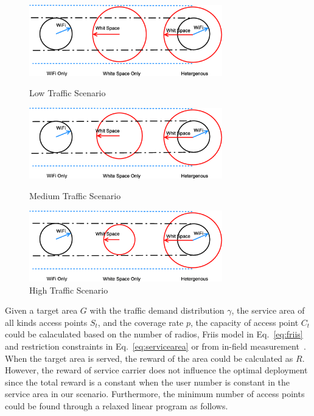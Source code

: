 \begin{figure}
\centering
\includegraphics[width=84mm]{figures/lowtraffic}
\vspace{-0.1in}
\caption{Low Traffic Scenario}                                                                 
\label{fig:lowtraffic}

\includegraphics[width=84mm]{figures/mediumtraffic}
\vspace{-0.1in}
\caption{Medium Traffic Scenario}                                                                 
\label{fig:mediumtraffic}


\includegraphics[width=84mm]{figures/hightraffic}
\vspace{-0.1in}
\caption{High Traffic Scenario}                                                                 
\label{fig:hightraffic}
\vspace{-0.1in}
\end{figure}

Given a target area $G$ with the traffic demand distribution $\gamma$, the service area 
of all kinds access points $S_t$, and the coverage rate $p$, the capacity of access point $C_t$ could 
be calaculated based on the number of radios, Friis model in Eq.~\ref{eq:friis} and restriction constraints in Eq.~\ref{eq:servicearea}
or from in-field measurement~\cite{cuileveraging}. 
When the target area is served, the reward of the area 
could be calculated as $R$. However, the reward of service carrier does not influence the 
optimal deployment since the total reward is a constant when the user number is constant in the 
service area in our scenario. Furthermore, the minimum number of access points could be found through 
a relaxed linear program as follows. 

